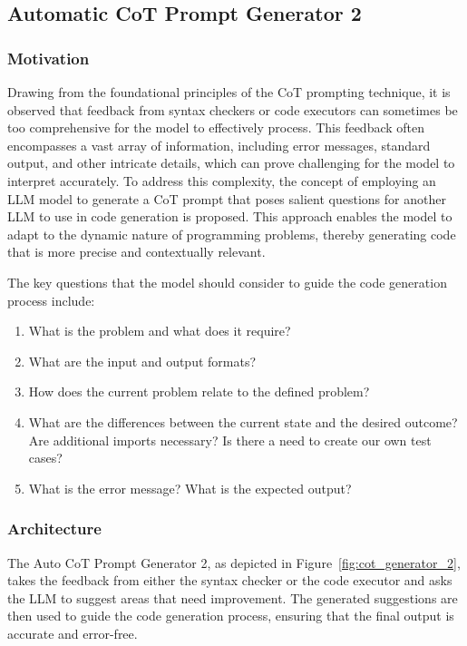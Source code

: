 \documentclass[a4paper,oneside]{book}
\begin{document}
\subsection{Automatic CoT Prompt Generator 2}
\subsubsection{Motivation}
Drawing from the foundational principles of the CoT prompting technique, it is observed that feedback from syntax checkers or code executors can sometimes be too comprehensive for the model to effectively process. This feedback often encompasses a vast array of information, including error messages, standard output, and other intricate details, which can prove challenging for the model to interpret accurately. To address this complexity, the concept of employing an LLM model to generate a CoT prompt that poses salient questions for another LLM to use in code generation is proposed. This approach enables the model to adapt to the dynamic nature of programming problems, thereby generating code that is more precise and contextually relevant.

The key questions that the model should consider to guide the code generation process include:
\begin{enumerate}
    \item What is the problem and what does it require?

    \item What are the input and output formats?

    \item How does the current problem relate to the defined problem?

    \item What are the differences between the current state and the desired outcome? Are additional imports necessary? Is there a need to create our own test cases?

    \item What is the error message? What is the expected output?
\end{enumerate}

\subsubsection{Architecture}
The Auto CoT Prompt Generator 2, as depicted in Figure~\ref{fig:cot_generator_2}, takes the feedback from either the syntax checker or the code executor and asks the LLM to suggest areas that need improvement. The generated suggestions are then used to guide the code generation process, ensuring that the final output is accurate and error-free.
\end{document}
